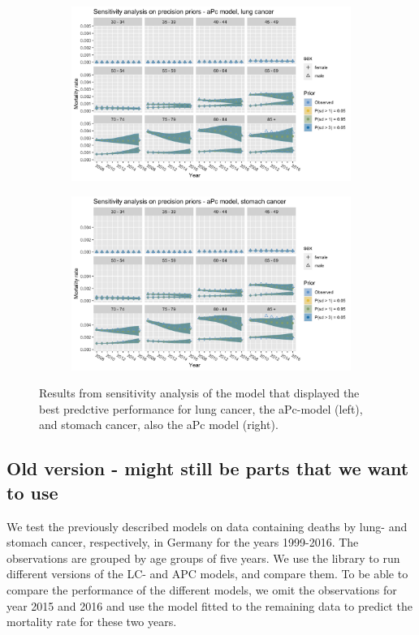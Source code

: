 \begin{figure}[h!]
    \centering
    \begin{subfigure}[b]{.45\linewidth}
        \includegraphics[width=\linewidth]{real-data/real-data-multivariate/Figures/sensitivity-analysis-aPc-by-period-lung.png}
    \end{subfigure}
    \begin{subfigure}[b]{.45\linewidth}
        \includegraphics[width=\linewidth]{real-data/real-data-multivariate/Figures/sensitivity-analysis-aPc-by-period-stomach.png}
    \end{subfigure}
    \caption{Results from sensitivity analysis of the model that displayed the best predctive performance for lung cancer, the aPc-model (left), and stomach cancer, also the aPc model (right). }
    \label{fig:mv-sensitivity}
\end{figure}

\newpage 
\subsection{Old version - might still be parts that we want to use}
We test the previously described models on data containing deaths by lung- and stomach cancer, respectively, in Germany for the years 1999-2016. The observations are grouped by age groups of five years. We use the \inlabru library to run different versions of the LC- and APC models, and compare them. To be able to compare the performance of the different models, we omit the observations for year 2015 and 2016 and use the model fitted to the remaining data to predict the mortality rate for these two years. 

